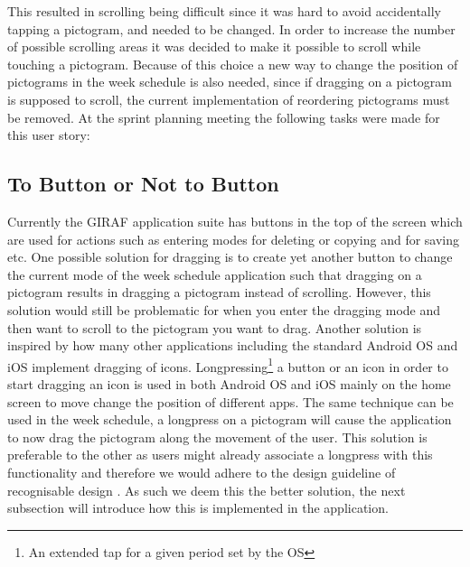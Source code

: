 This resulted in scrolling being difficult since it was hard to avoid accidentally tapping a pictogram, and needed to be changed.
In order to increase the number of possible scrolling areas it was decided to make it possible to scroll while touching a pictogram. 
Because of this choice a new way to change the position of pictograms in the week schedule is also needed, since if dragging on a pictogram is supposed to scroll, the current implementation of reordering pictograms must be removed. 
\bigskip \noindent
At the sprint planning meeting the following tasks were made for this user story:
\begin{enumberate}
	\item {}
	\item {}
\end{enumberate}
\subsection*{To Button or Not to Button} %
Currently the GIRAF application suite has buttons in the top of the screen which are used for actions such as entering modes for deleting or copying and for saving etc. 
One possible solution for dragging is to create yet another button to change the current mode of the week schedule application such that dragging on a pictogram results in dragging a pictogram instead of scrolling.
However, this solution would still be problematic for when you enter the dragging mode and then want to scroll to the pictogram you want to drag.
Another solution is inspired by how many other applications including the standard Android OS and iOS implement dragging of icons.
Longpressing\footnote{An extended tap for a given period set by the OS} a button or an icon in order to start dragging an icon is used in both Android OS and iOS mainly on the home screen to move change the position of different apps.
The same technique can be used in the week schedule, a longpress on a pictogram will cause the application to now drag the pictogram along the movement of the user.
This solution is preferable to the other as users might already associate a longpress with this functionality and therefore we would adhere to the design guideline of recognisable design \cite[p.~51]{DESIGNBOOK}.
As such we deem this the better solution, the next subsection will introduce how this is implemented in the application.

